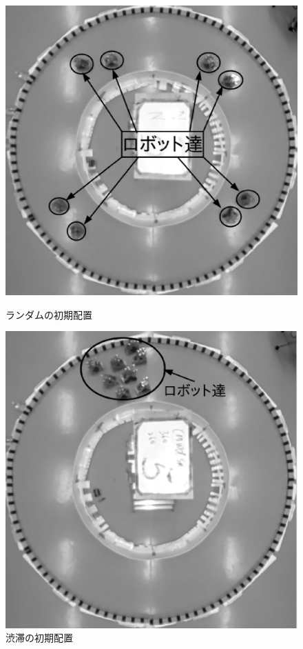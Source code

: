 \vspace{-3mm}
\begin{figure}[h]
    \begin{minipage}{0.49\linewidth}
        \centering
        \includegraphics[width=1.0\linewidth]{startrand.eps}
        \caption{ランダムの初期配置}
        \label{randstart}
    \end{minipage}
    \begin{minipage}{0.49\linewidth}
        \centering
        \includegraphics[width=1.0\linewidth]{start_crowd.eps}
        \caption{渋滞の初期配置}
        \label{crowdstart}
    \end{minipage}
\end{figure}
